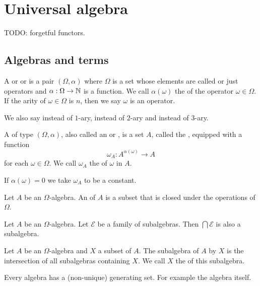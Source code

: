 \chapter{Universal algebra}
TODO: forgetful functors.

\section{Algebras and terms}
\begin{definition}
A  or  or  is a pair $(\Omega, \alpha)$ where $\Omega$ is a set whose elements are called  or just operators and $\alpha: \Omega \to \mathbb{N}$ is a function. We call $\alpha(\omega)$ the  of the operator $\omega\in\Omega$. If the arity of $\omega\in\Omega$ is $n$, then we say $\omega$ is an  operator.
\end{definition}
We also say  instead of $1$-ary,  instead of $2$-ary and  instead of $3$-ary.

\begin{definition}
A  of type $(\Omega,\alpha)$, also called an  or , is a set $A$, called the , equipped with a function
\[ \omega_A: A^{\alpha(\omega)}\to A \]
for each $\omega\in\Omega$. We call $\omega_A$ the  of $\omega$ in $A$.

If $\alpha(\omega) = 0$ we take $\omega_A$ to be a constant.
\end{definition}

\begin{definition}
Let $A$ be an $\Omega$-algebra. An  of $A$ is a subset that is closed under the operations of $\Omega$.
\end{definition}

\begin{lemma} \label{intersectionSubalgebra}
Let $A$ be an $\Omega$-algebra. Let $\mathcal{E}$ be a family of subalgebras. Then $\bigcap \mathcal{E}$ is also a subalgebra. 
\end{lemma}

\begin{definition}
Let $A$ be an $\Omega$-algebra and $X$ a subset of $A$. The subalgebra of $A$  by $X$ is the intersection of all subalgebras containing $X$. We call $X$ the  of this subalgebra.
\end{definition}
Every algebra has a (non-unique) generating set. For example the algebra itself.

